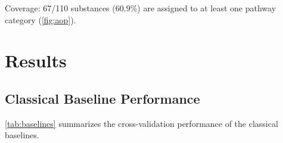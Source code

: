 \documentclass[twoside,twocolumn,9pt]{article}
\newcommand{\nsub}{110}
\begin{document}
Coverage: 67/\nsub{} substances (60.9\%) are assigned to at least one
pathway category (\ref{fig:aop}).


\section{Results}
\label{sec:results}

\subsection{Classical Baseline Performance}
\label{sec:results_classical}

\ref{tab:baselines} summarizes the cross-validation performance of the
classical baselines.
\end{document}
